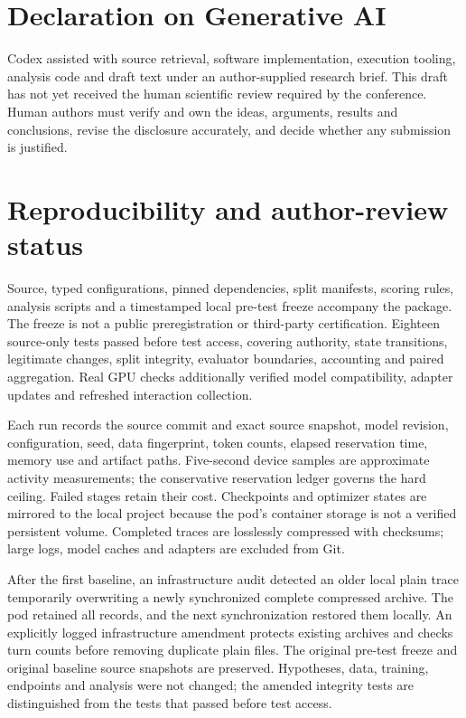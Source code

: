 \documentclass{svproc}
\begin{document}
\section{Declaration on Generative AI}
Codex assisted with source retrieval, software implementation, execution tooling,
analysis code and draft text under an author-supplied research brief. This draft
has not yet received the human scientific review required by the conference.
Human authors must verify and own the ideas, arguments, results and conclusions,
revise the disclosure accurately, and decide whether any submission is justified.

\section{Reproducibility and author-review status}
Source, typed configurations, pinned dependencies, split manifests, scoring rules,
analysis scripts and a timestamped local pre-test freeze accompany the package.
The freeze is not a public preregistration or third-party certification. Eighteen
source-only tests passed before test access, covering authority, state transitions,
legitimate changes, split integrity, evaluator boundaries, accounting and paired
aggregation. Real GPU checks additionally verified model compatibility, adapter
updates and refreshed interaction collection.

Each run records the source commit and exact source snapshot, model revision,
configuration, seed, data fingerprint, token counts, elapsed reservation time,
memory use and artifact paths. Five-second device samples are approximate activity
measurements; the conservative reservation ledger governs the hard ceiling.
Failed stages retain their cost. Checkpoints and optimizer states are mirrored
to the local project because the pod's container storage is not a verified
persistent volume. Completed traces are losslessly compressed with checksums;
large logs, model caches and adapters are excluded from Git.

After the first baseline, an infrastructure audit detected an older local plain
trace temporarily overwriting a newly synchronized complete compressed archive.
The pod retained all records, and the next synchronization restored them locally.
An explicitly logged infrastructure amendment protects existing archives and
checks turn counts before removing duplicate plain files. The original pre-test
freeze and original baseline source snapshots are preserved. Hypotheses, data,
training, endpoints and analysis were not changed; the amended integrity tests
are distinguished from the tests that passed before test access.
\end{document}

